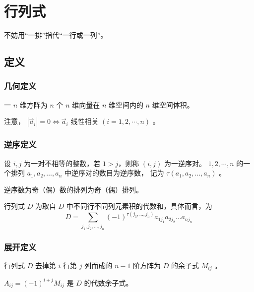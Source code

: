 \chapter{行列式}

不妨用“一排”指代“一行或一列”。

\section{定义}

\subsection{几何定义}

\begin{Def}[几何定义]

    一 $ n $ 维方阵为 $ n $ 个 $ n $ 维向量在 $ n $ 维空间内的 $ n $ 维空间体积。
\end{Def}

注意， $ |\vec{a}_i| = 0 \Leftrightarrow \vec{a}_i $ 线性相关 $ (i = 1,2,\cdots,n) $ 。

\subsection{逆序定义}

\begin{Def}[逆序和逆序数]

    设 $ i,j $ 为一对不相等的整数，若 $ 1>j $，则称 $ (i,j) $ 为一逆序对。
    $ 1,2,\cdots,n $ 的一个排列 $ a_1,a_2,\dots,a_n $  中逆序对的数目为逆序数，
    记为 $ \tau(a_1,a_2,\dots,a_n) $ 。

    逆序数为奇（偶）数的排列为奇（偶）排列。
\end{Def}

\begin{Def}[逆序定义]

    行列式 $ D $ 为取自 $ D $ 中不同行不同列元素积的代数和，具体而言，为$$
        D = \sum_{j_1,j_2,\dots,j_n}(-1)^{\tau(j_1,\dots,j_n)}a_{1j_1}a_{2j_2}\dots a_{nj_n}
    $$ 
\end{Def}

\subsection{展开定义}

\begin{Def}[余子式和代数余子式]

    行列式 $ D $ 去掉第 $ i $  行第 $ j $ 列而成的 $ n-1 $ 阶方阵为 $ D $ 的余子式 $ M_{ij} $ 。

    $ A_{ij} = (-1)^{i+j}M_{ij} $ 是 $ D $ 的代数余子式。
\end{Def}


